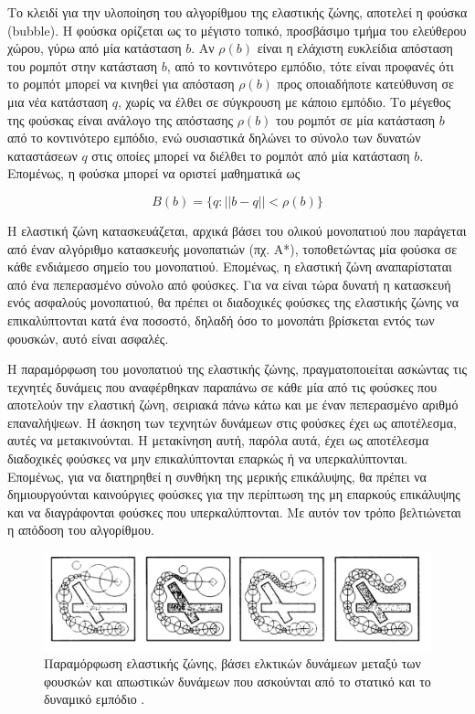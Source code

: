 \bigskip
Το κλειδί για την υλοποίηση του αλγορίθμου της ελαστικής ζώνης, αποτελεί η φούσκα (bubble). Η φούσκα ορίζεται ως το μέγιστο τοπικό, προσβάσιμο τμήμα του ελεύθερου χώρου, γύρω από μία κατάσταση $b$. Αν $\rho(b)$ είναι η ελάχιστη ευκλείδια απόσταση του ρομπότ στην κατάσταση $b$, από το κοντινότερο εμπόδιο, τότε είναι προφανές ότι το ρομπότ μπορεί να κινηθεί για απόσταση $\rho(b)$ προς οποιαδήποτε κατεύθυνση σε μια νέα κατάσταση $q$, χωρίς να έλθει σε σύγκρουση με κάποιο εμπόδιο. Το μέγεθος της φούσκας είναι ανάλογο της απόστασης $\rho(b)$ του ρομπότ σε μία κατάσταση $b$ από το κοντινότερο εμπόδιο, ενώ ουσιαστικά δηλώνει το σύνολο των δυνατών καταστάσεων $q$ στις οποίες μπορεί να διέλθει το ρομπότ από μία κατάσταση $b$. Επομένως, η φούσκα μπορεί να οριστεί μαθηματικά ως

\begin{equation}
	B(b) = \{q: ||b-q|| < \rho(b)\}
\end{equation}

\bigskip
Η ελαστική ζώνη κατασκευάζεται, αρχικά βάσει του ολικού μονοπατιού που παράγεται από έναν αλγόριθμο κατασκευής μονοπατιών (πχ. Α*), τοποθετώντας μία φούσκα σε κάθε ενδιάμεσο σημείο του μονοπατιού. Επομένως, η ελαστική ζώνη αναπαρίσταται από ένα πεπερασμένο σύνολο από φούσκες. Για να είναι τώρα δυνατή η κατασκευή ενός ασφαλούς μονοπατιού, θα πρέπει οι διαδοχικές φούσκες της ελαστικής ζώνης να επικαλύπτονται κατά ένα ποσοστό, δηλαδή όσο το μονοπάτι βρίσκεται εντός των φουσκών, αυτό είναι ασφαλές.

\bigskip
Η παραμόρφωση του μονοπατιού της ελαστικής ζώνης, πραγματοποιείται ασκώντας τις τεχνητές δυνάμεις που αναφέρθηκαν παραπάνω σε κάθε μία από τις φούσκες που αποτελούν την ελαστική ζώνη, σειριακά πάνω κάτω και με έναν πεπερασμένο αριθμό επαναλήψεων. Η άσκηση των τεχνητών δυνάμεων στις φούσκες έχει ως αποτέλεσμα, αυτές να μετακινούνται. Η μετακίνηση αυτή, παρόλα αυτά, έχει ως αποτέλεσμα διαδοχικές φούσκες να μην επικαλύπτονται επαρκώς ή να υπερκαλύπτονται. Επομένως, για να διατηρηθεί η συνθήκη της μερικής επικάλυψης, θα πρέπει να δημιουργούνται καινούργιες φούσκες για την περίπτωση της μη επαρκούς επικάλυψης και να διαγράφονται φούσκες που υπερκαλύπτονται. Με αυτόν τον τρόπο βελτιώνεται η απόδοση του αλγορίθμου.


\begin{figure}[!ht]
	\centering
	\includegraphics[width=\linewidth]{Chapters/Chapter3/Figures/eband.png}
	\caption[]{Παραμόρφωση ελαστικής ζώνης, βάσει ελκτικών δυνάμεων μεταξύ των φουσκών και απωστικών δυνάμεων που ασκούνται από το στατικό και το δυναμικό εμπόδιο \cite{eband}.}
	\label{fig:eband}
\end{figure}


